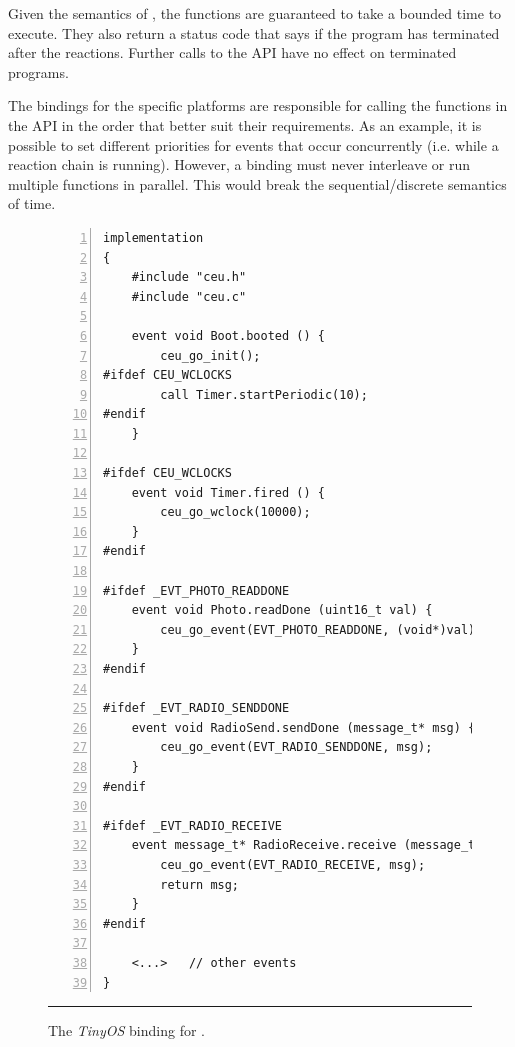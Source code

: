 Given the semantics of \CEU, the functions are guaranteed to take a bounded 
time to execute.
They also return a status code that says if the \CEU{} program has terminated 
after the reactions.
Further calls to the API have no effect on terminated programs.

The bindings for the specific platforms are responsible for calling the 
functions in the API in the order that better suit their requirements.
As an example, it is possible to set different priorities for events that occur 
concurrently (i.e. while a reaction chain is running).
However, a binding must never interleave or run multiple functions in parallel.
This would break the \CEU sequential/discrete semantics of time.


\begin{figure}[t]
\begin{lstlisting}[numbers=left,xleftmargin=2em]
implementation
{
    #include "ceu.h"
    #include "ceu.c"

    event void Boot.booted () {
        ceu_go_init();
#ifdef CEU_WCLOCKS
        call Timer.startPeriodic(10);
#endif
    }
    
#ifdef CEU_WCLOCKS
    event void Timer.fired () {
        ceu_go_wclock(10000);
    }
#endif

#ifdef _EVT_PHOTO_READDONE
    event void Photo.readDone (uint16_t val) {
        ceu_go_event(EVT_PHOTO_READDONE, (void*)val);
    }
#endif

#ifdef _EVT_RADIO_SENDDONE
    event void RadioSend.sendDone (message_t* msg) {
        ceu_go_event(EVT_RADIO_SENDDONE, msg);
    }
#endif

#ifdef _EVT_RADIO_RECEIVE
    event message_t* RadioReceive.receive (message_t* msg) {
        ceu_go_event(EVT_RADIO_RECEIVE, msg);
        return msg;
    }
#endif

    <...>   // other events
}
\end{lstlisting}
\rule{14cm}{0.37pt}
\caption{
The \emph{TinyOS} binding for \CEU.
\label{lst.impl.tinyos}
}
\end{figure}

